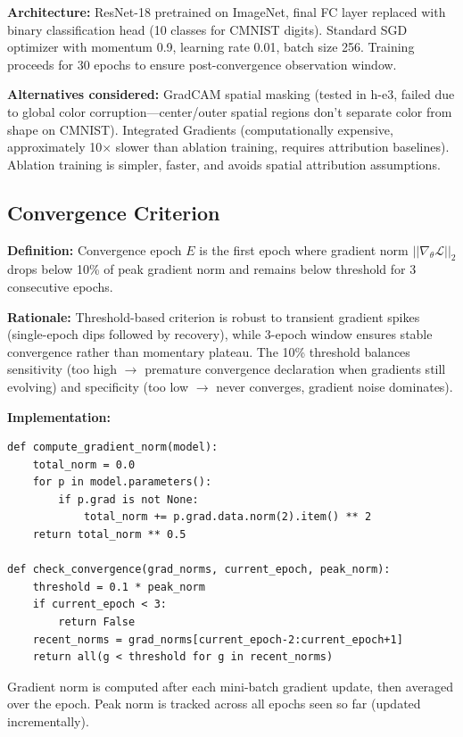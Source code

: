 \textbf{Architecture:} ResNet-18 pretrained on ImageNet, final FC layer replaced with binary classification head (10 classes for CMNIST digits). Standard SGD optimizer with momentum 0.9, learning rate 0.01, batch size 256. Training proceeds for 30 epochs to ensure post-convergence observation window.

\textbf{Alternatives considered:} GradCAM spatial masking (tested in h-e3, failed due to global color corruption---center/outer spatial regions don't separate color from shape on CMNIST). Integrated Gradients (computationally expensive, approximately 10$\times$ slower than ablation training, requires attribution baselines). Ablation training is simpler, faster, and avoids spatial attribution assumptions.

\subsection{Convergence Criterion}

\textbf{Definition:} Convergence epoch $E$ is the first epoch where gradient norm $||\nabla_\theta \mathcal{L}||_2$ drops below 10\% of peak gradient norm and remains below threshold for 3 consecutive epochs.

\textbf{Rationale:} Threshold-based criterion is robust to transient gradient spikes (single-epoch dips followed by recovery), while 3-epoch window ensures stable convergence rather than momentary plateau. The 10\% threshold balances sensitivity (too high $\rightarrow$ premature convergence declaration when gradients still evolving) and specificity (too low $\rightarrow$ never converges, gradient noise dominates).

\textbf{Implementation:}
\begin{verbatim}
def compute_gradient_norm(model):
    total_norm = 0.0
    for p in model.parameters():
        if p.grad is not None:
            total_norm += p.grad.data.norm(2).item() ** 2
    return total_norm ** 0.5

def check_convergence(grad_norms, current_epoch, peak_norm):
    threshold = 0.1 * peak_norm
    if current_epoch < 3:
        return False
    recent_norms = grad_norms[current_epoch-2:current_epoch+1]
    return all(g < threshold for g in recent_norms)
\end{verbatim}

Gradient norm is computed after each mini-batch gradient update, then averaged over the epoch. Peak norm is tracked across all epochs seen so far (updated incrementally).


